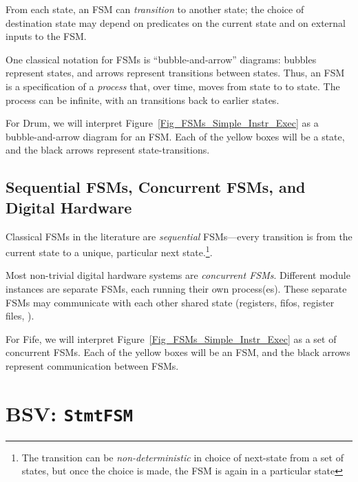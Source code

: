 From each state, an FSM can \emph{transition} to another state; the
choice of destination state may depend on predicates on the current
state and on external inputs to the FSM.

One classical notation for FSMs is ``bubble-and-arrow'' diagrams:
bubbles represent states, and arrows represent transitions between
states.  Thus, an FSM is a specification of a \emph{process} that,
over time, moves from state to to state.  The process can be infinite,
with an transitions back to earlier states.


For Drum, we will interpret
Figure~\ref{Fig_FSMs_Simple_Instr_Exec} as a bubble-and-arrow diagram
for an FSM.  Each of the yellow boxes will be a state, and the black
arrows represent state-transitions.


\subsection{Sequential FSMs, Concurrent FSMs, and Digital Hardware}


Classical FSMs in the literature are \emph{sequential} FSMs---every
transition is from the current state to a unique, particular next
state.\footnote{The transition can be \emph{non-deterministic} in
choice of next-state from a set of states, but once the choice is
made, the FSM is again in a particular state}.

Most non-trivial digital hardware systems are \emph{concurrent FSMs}.
Different module instances are separate FSMs, each running their own
process(es).  These separate FSMs may communicate with each other
{\via} shared state (registers, fifos, register files, {\etc}).


For Fife, we will interpret Figure~\ref{Fig_FSMs_Simple_Instr_Exec} as
a set of concurrent FSMs.  Each of the yellow boxes will be an FSM,
and the black arrows represent communication between FSMs.


\section{BSV: {\tt StmtFSM}}

